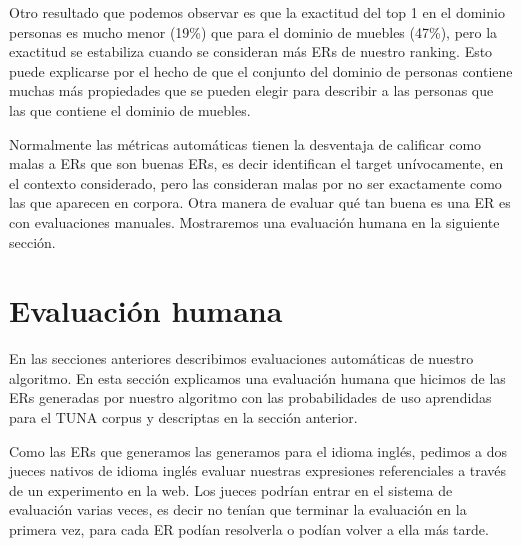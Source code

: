 
Otro resultado que podemos observar es que la exactitud  del top 1 en el dominio personas es mucho menor (19\%) que para el dominio de muebles (47\%), pero la exactitud se estabiliza cuando se consideran m\'as ERs de nuestro ranking. Esto puede explicarse por el hecho de que el conjunto del dominio de personas contiene muchas m\'as propiedades que se pueden elegir para describir a las personas que las que contiene el dominio de muebles.

Normalmente las m\'etricas autom\'aticas tienen la desventaja de calificar como malas a ERs que son buenas ERs, es decir identifican el target un\'ivocamente, en el contexto considerado, pero las consideran malas por no ser exactamente como las que aparecen en corpora. Otra manera de evaluar qu\'e tan buena es una ER es con evaluaciones manuales. Mostraremos una evaluaci\'on humana en la siguiente secci\'on.

 
\section{Evaluaci\'on humana} \label{sec:humanevaluation}

En las secciones anteriores describimos evaluaciones autom\'aticas de nuestro algoritmo. En esta secci\'on explicamos una evaluaci\'on humana que hicimos de las ERs generadas por nuestro algoritmo con las probabilidades de uso aprendidas para el TUNA corpus y descriptas en la secci\'on anterior.  

Como las ERs que generamos las generamos para el idioma ingl\'es, pedimos a dos jueces nativos de idioma ingl\'es evaluar nuestras expresiones referenciales a trav\'es de un experimento en la web. Los jueces podr\'{i}an entrar en el sistema de evaluaci\'on varias veces, es decir no ten\'ian que terminar la evaluaci\'on en la primera vez, para cada ER pod\'ian resolverla o pod\'ian volver a ella m\'as tarde. 

